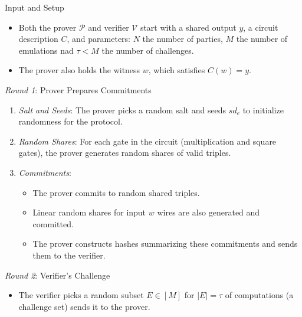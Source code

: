 \documentclass[11pt]{report}
\theoremstyle{definition}
\theoremstyle{plain}
\begin{document}
\begin{protocol}\label{def:mpc-cut-and-choose}

  \noindent Input and Setup
  \begin{itemize}[parsep=0pt, itemsep=0pt]
    \item Both the prover $\mathcal{P}$ and verifier $\mathcal{V}$ start with a shared output $  y  $, a circuit description $  C  $, and parameters:  $N$ the number of parties, $M$ the number of emulations nad $\tau < M$ the number of challenges.
    \item The prover also holds the witness $  w  $, which satisfies $  C(w) = y  $.
  \end{itemize}

  \noindent \textit{Round 1}: Prover Prepares Commitments
  \begin{enumerate}[parsep=0pt, itemsep=0pt]
    \item \textit{Salt and Seeds}: The prover picks a random salt and seeds $sd_e$ to initialize randomness for the protocol.
    \item \textit{Random Shares}: For each gate in the circuit (multiplication and square gates), the prover generates random shares of valid triples.
    \item \textit{Commitments}:
          \begin{itemize}[parsep=0pt, itemsep=0pt]
            \item The prover commits to random shared triples.
            \item Linear random shares for input $w$ wires are also generated and committed.
            \item The prover constructs hashes summarizing these commitments and sends them to the verifier.
          \end{itemize}
  \end{enumerate}

  \noindent \textit{Round 2}: Verifier's Challenge\label{cac:round2}
  \begin{itemize}[parsep=0pt, itemsep=0pt]
    \item The verifier picks a random subset $  E \in [M]  $ for $|E| = \tau$ of computations (a challenge set) sends it to the prover.
  \end{itemize}


\end{protocol}
\end{document}
